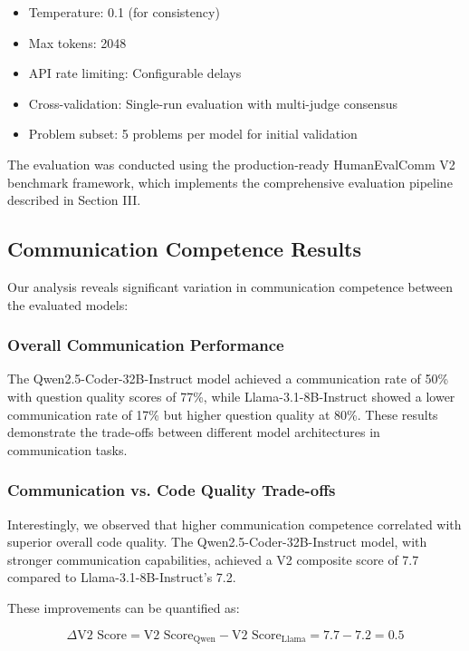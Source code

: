 \documentclass[conference]{IEEEtran}
\begin{document}
\begin{itemize}
    \item Temperature: 0.1 (for consistency)
    \item Max tokens: 2048
    \item API rate limiting: Configurable delays
    \item Cross-validation: Single-run evaluation with multi-judge consensus
    \item Problem subset: 5 problems per model for initial validation
\end{itemize}

The evaluation was conducted using the production-ready HumanEvalComm V2 benchmark framework, which implements the comprehensive evaluation pipeline described in Section III.

\subsection{Communication Competence Results}

Our analysis reveals significant variation in communication competence between the evaluated models:

\subsubsection{Overall Communication Performance}

The Qwen2.5-Coder-32B-Instruct model achieved a communication rate of 50\% with question quality scores of 77\%, while Llama-3.1-8B-Instruct showed a lower communication rate of 17\% but higher question quality at 80\%. These results demonstrate the trade-offs between different model architectures in communication tasks.

\subsubsection{Communication vs. Code Quality Trade-offs}

Interestingly, we observed that higher communication competence correlated with superior overall code quality. The Qwen2.5-Coder-32B-Instruct model, with stronger communication capabilities, achieved a V2 composite score of 7.7 compared to Llama-3.1-8B-Instruct's 7.2.

These improvements can be quantified as:

\begin{equation}
\Delta \text{V2 Score} = \text{V2 Score}_{\text{Qwen}} - \text{V2 Score}_{\text{Llama}} = 7.7 - 7.2 = 0.5
\end{equation}
\end{document}
